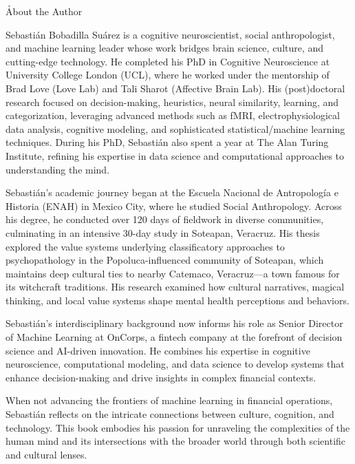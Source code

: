 \h{About the Author}

Sebastián Bobadilla Suárez is a cognitive neuroscientist, social anthropologist, and machine learning leader whose work bridges brain science, culture, and cutting-edge technology. He completed his PhD in Cognitive Neuroscience at University College London (UCL), where he worked under the mentorship of Brad Love (Love Lab) and Tali Sharot (Affective Brain Lab). His (post)doctoral research focused on decision-making, heuristics, neural similarity, learning, and categorization, leveraging advanced methods such as fMRI, electrophysiological data analysis, cognitive modeling, and sophisticated statistical/machine learning techniques. During his PhD, Sebastián also spent a year at The Alan Turing Institute, refining his expertise in data science and computational approaches to understanding the mind.

Sebastián’s academic journey began at the Escuela Nacional de Antropología e Historia (ENAH) in Mexico City, where he studied Social Anthropology. Across his degree, he conducted over 120 days of fieldwork in diverse communities, culminating in an intensive 30-day study in Soteapan, Veracruz. His thesis explored the value systems underlying classificatory approaches to psychopathology in the Popoluca-influenced community of Soteapan, which maintains deep cultural ties to nearby Catemaco, Veracruz—a town famous for its witchcraft traditions. His research examined how cultural narratives, magical thinking, and local value systems shape mental health perceptions and behaviors.

Sebastián’s interdisciplinary background now informs his role as Senior Director of Machine Learning at OnCorps, a fintech company at the forefront of decision science and AI-driven innovation. He combines his expertise in cognitive neuroscience, computational modeling, and data science to develop systems that enhance decision-making and drive insights in complex financial contexts.

When not advancing the frontiers of machine learning in financial operations, Sebastián reflects on the intricate connections between culture, cognition, and technology. This book embodies his passion for unraveling the complexities of the human mind and its intersections with the broader world through both scientific and cultural lenses.
